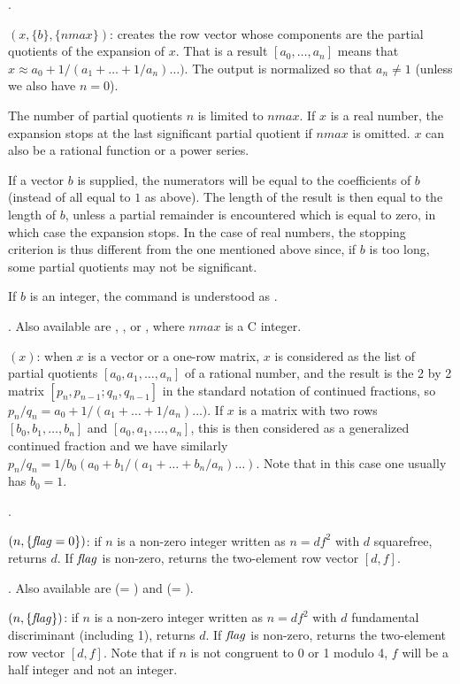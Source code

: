 .

$(x,\{b\},\{nmax\})$: creates the row vector whose
components are the partial quotients of the 
expansion of $x$. That is a result $[a_0,\dots,a_n]$ means that $x \approx
a_0+1/(a_1+\dots+1/a_n)\dots)$. The output is normalized so that $a_n \neq 1$
(unless we also have $n = 0$).

The number of partial quotients $n$ is limited to $nmax$. If $x$ is a real
number, the expansion stops at the last significant partial quotient if
$nmax$ is omitted. $x$ can also be a rational function or a power series.

If a vector $b$ is supplied, the numerators will be equal to the coefficients
of $b$ (instead of all equal to $1$ as above). The length of the result is
then equal to the length of $b$, unless a partial remainder is encountered
which is equal to zero, in which case the expansion stops. In the case of
real numbers, the stopping criterion is thus different from the one mentioned
above since, if $b$ is too long, some partial quotients may not be
significant.

If $b$ is an integer, the command is understood as .

. Also available are
, , or , where $nmax$
is a C integer.

$(x)$: when $x$ is a vector or a one-row matrix, $x$
is considered as the list of partial quotients $[a_0,a_1,\dots,a_n]$ of a
rational number, and the result is the 2 by 2 matrix
$[p_n,p_{n-1};q_n,q_{n-1}]$ in the standard notation of continued fractions,
so $p_n/q_n=a_0+1/(a_1+\dots+1/a_n)\dots)$. If $x$ is a matrix with two rows
$[b_0,b_1,\dots,b_n]$ and $[a_0,a_1,\dots,a_n]$, this is then considered as a
generalized continued fraction and we have similarly
$p_n/q_n=1/b_0(a_0+b_1/(a_1+\dots+b_n/a_n)\dots)$. Note that in this case one
usually has $b_0=1$.

.

$(n,\{\hbox{\it f\kern0pt lag\/}=0\})$: if $n$ is a non-zero integer written as
$n=df^2$ with $d$ squarefree, returns $d$. If $\hbox{\it f\kern0pt lag\/}$ is non-zero,
returns the two-element row vector $[d,f]$.

.
Also available are  (= ) and 
(= ).

$(n,\{\hbox{\it f\kern0pt lag\/}\})$: if $n$ is a non-zero integer written as
$n=df^2$ with $d$ fundamental discriminant (including 1), returns $d$. If
$\hbox{\it f\kern0pt lag\/}$ is non-zero, returns the two-element row vector $[d,f]$. Note that if
$n$ is not congruent to 0 or 1 modulo 4, $f$ will be a half integer and not
an integer.

